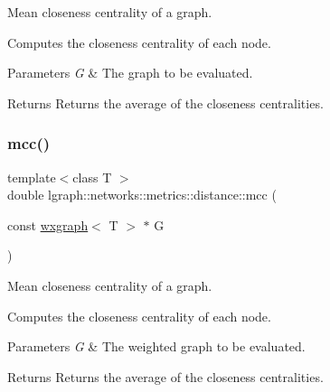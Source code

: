 Mean closeness centrality of a graph. 

Computes the closeness centrality of each node.


\begin{DoxyParams}{Parameters}
{\em G} & The graph to be evaluated. \\
\hline
\end{DoxyParams}
\begin{DoxyReturn}{Returns}
Returns the average of the closeness centralities. 
\end{DoxyReturn}
\mbox{\label{namespacelgraph_1_1networks_1_1metrics_1_1distance_a48bdb12a1b0b452f68f8d84eea4ea9c8}} 
\subsubsection{\texorpdfstring{mcc()}{mcc()}\hspace{0.1cm}{\footnotesize\ttfamily [2/4]}}
{\footnotesize\ttfamily template$<$class T $>$ \\
double lgraph\+::networks\+::metrics\+::distance\+::mcc (\begin{DoxyParamCaption}\item[{const \hyperlink{classlgraph_1_1wxgraph}{wxgraph}$<$ T $>$ $\ast$}]{G }\end{DoxyParamCaption})}



Mean closeness centrality of a graph. 

Computes the closeness centrality of each node.


\begin{DoxyParams}{Parameters}
{\em G} & The weighted graph to be evaluated. \\
\hline
\end{DoxyParams}
\begin{DoxyReturn}{Returns}
Returns the average of the closeness centralities. 
\end{DoxyReturn}
\mbox{\label{namespacelgraph_1_1networks_1_1metrics_1_1distance_a80312d952679dca4ec5249298f12d156}} 
